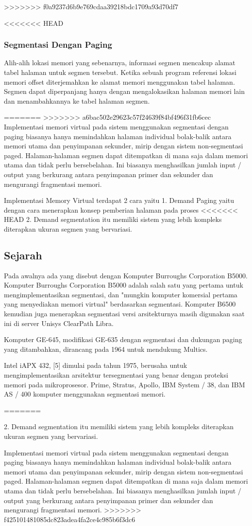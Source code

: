 >>>>>>> f0a9237d6b9e769cdaa39218bdc1709a93d70df7

<<<<<<< HEAD
\subsubsection {Segmentasi Dengan Paging}
Alih-alih lokasi memori yang sebenarnya, informasi segmen mencakup alamat tabel halaman untuk segmen tersebut. Ketika sebuah program referensi lokasi memori offset diterjemahkan ke alamat memori menggunakan tabel halaman. Segmen dapat diperpanjang hanya dengan mengalokasikan halaman memori lain dan menambahkannya ke tabel halaman segmen.

=======
>>>>>>> a6bac502e29623c57f24639f84bf496f31fb6cec
Implementasi memori virtual pada sistem menggunakan segmentasi dengan paging biasanya hanya memindahkan halaman individual bolak-balik antara memori utama dan penyimpanan sekunder, mirip dengan sistem non-segmentasi paged. Halaman-halaman segmen dapat ditempatkan di mana saja dalam memori utama dan tidak perlu bersebelahan. Ini biasanya menghasilkan jumlah input / output yang berkurang antara penyimpanan primer dan sekunder dan mengurangi fragmentasi memori.

Implementasi Memory Virtual terdapat 2 cara yaitu 
	1. Demand Paging yaitu dengan cara menerapkan konsep pemberian halaman pada proses
<<<<<<< HEAD
	2. Demand segmentation itu memiliki sistem yang lebih kompleks diterapkan ukuran segmen yang bervariasi.
\subsection{Sejarah}
Pada awalnya ada yang disebut dengan Komputer Burroughs Corporation B5000. Komputer Burroughs Corporation B5000 adalah salah satu yang pertama untuk mengimplementasikan segmentasi, dan "mungkin komputer komersial pertama yang menyediakan memori virtual" berdasarkan segmentasi. Komputer B6500 kemudian juga menerapkan segmentasi versi arsitekturnya masih digunakan saat ini di server Unisys ClearPath Libra.

Komputer GE-645, modifikasi GE-635 dengan segmentasi dan dukungan paging yang ditambahkan, dirancang pada 1964 untuk mendukung Multics.

Intel iAPX 432, [5] dimulai pada tahun 1975, berusaha untuk mengimplementasikan arsitektur tersegmentasi yang benar dengan proteksi memori pada mikroprosesor.
Prime, Stratus, Apollo, IBM System / 38, dan IBM AS / 400 komputer menggunakan segmentasi memori.

=======
	
2. Demand segmentation itu memiliki sistem yang lebih kompleks diterapkan ukuran segmen yang bervariasi.

Implementasi memori virtual pada sistem menggunakan segmentasi dengan paging biasanya hanya memindahkan halaman individual bolak-balik antara memori utama dan penyimpanan sekunder, mirip dengan sistem non-segmentasi paged. Halaman-halaman segmen dapat ditempatkan di mana saja dalam memori utama dan tidak perlu bersebelahan. Ini biasanya menghasilkan jumlah input / output yang berkurang antara penyimpanan primer dan sekunder dan mengurangi fragmentasi memori.
>>>>>>> f425101481085dc823adea4fa2ce4c985b6f3dc6
